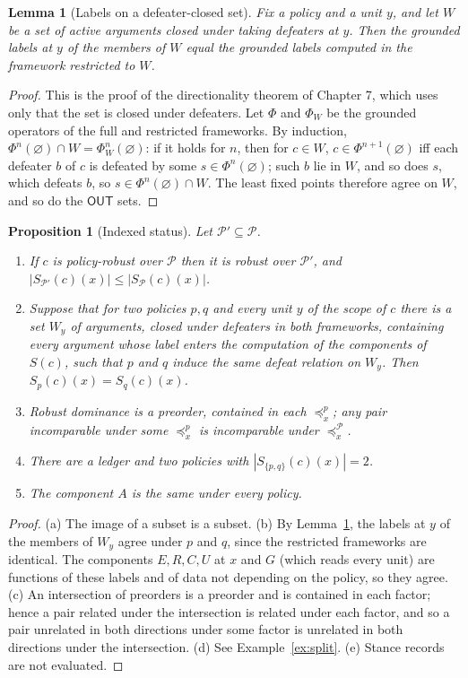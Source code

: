 \documentclass[11pt]{article}
\theoremstyle{plain}
\newtheorem{proposition}[theorem]{Proposition}
\newtheorem{lemma}[theorem]{Lemma}
\theoremstyle{definition}
\theoremstyle{remark}
\newcommand{\OUT}{\textsf{OUT}}
\begin{document}
\begin{lemma}[Labels on a defeater-closed set]\label{lem:closed}
Fix a policy and a unit $y$, and let $W$ be a set of active arguments closed under taking defeaters at $y$. Then the grounded labels at $y$ of the members of $W$ equal the grounded labels computed in the framework restricted to $W$.
\end{lemma}

\begin{proof}
This is the proof of the directionality theorem of Chapter 7, which uses only that the set is closed under defeaters. Let $\Phi$ and $\Phi_W$ be the grounded operators of the full and restricted frameworks. By induction, $\Phi^n(\varnothing)\cap W=\Phi_W^n(\varnothing)$: if it holds for $n$, then for $c\in W$, $c\in\Phi^{n+1}(\varnothing)$ iff each defeater $b$ of $c$ is defeated by some $s\in\Phi^n(\varnothing)$; such $b$ lie in $W$, and so does $s$, which defeats $b$, so $s\in\Phi^n(\varnothing)\cap W$. The least fixed points therefore agree on $W$, and so do the $\OUT$ sets.
\end{proof}

\begin{proposition}[Indexed status]\label{prop:indexed}
Let $\mathcal P'\subseteq\mathcal P$.
\begin{enumerate}[label=(\alph*)]
\item If $c$ is policy-robust over $\mathcal P$ then it is robust over $\mathcal P'$, and $|S_{\mathcal P'}(c)(x)|\le|S_{\mathcal P}(c)(x)|$.
\item Suppose that for two policies $p,q$ and every unit $y$ of the scope of $c$ there is a set $W_y$ of arguments, closed under defeaters in both frameworks, containing every argument whose label enters the computation of the components of $S(c)$, such that $p$ and $q$ induce the same defeat relation on $W_y$. Then $S_p(c)(x)=S_q(c)(x)$.
\item Robust dominance is a preorder, contained in each $\preceq^p_x$; any pair incomparable under some $\preceq^p_x$ is incomparable under $\preceq^{\mathcal P}_x$.
\item There are a ledger and two policies with $|S_{\{p,q\}}(c)(x)|=2$.
\item The component $A$ is the same under every policy.
\end{enumerate}
\end{proposition}

\begin{proof}
(a) The image of a subset is a subset. (b) By Lemma~\ref{lem:closed}, the labels at $y$ of the members of $W_y$ agree under $p$ and $q$, since the restricted frameworks are identical. The components $E,R,C,U$ at $x$ and $G$ (which reads every unit) are functions of these labels and of data not depending on the policy, so they agree. (c) An intersection of preorders is a preorder and is contained in each factor; hence a pair related under the intersection is related under each factor, and so a pair unrelated in both directions under some factor is unrelated in both directions under the intersection. (d) See Example~\ref{ex:split}. (e) Stance records are not evaluated.
\end{proof}
\end{document}
